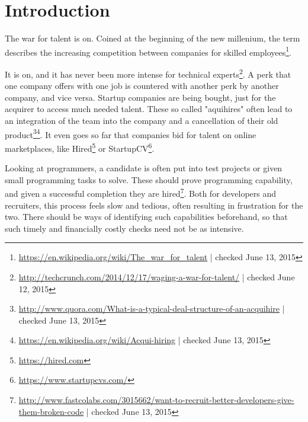 \chapter{Introduction}\label{ch:introduction}
The war for talent is on. Coined at the beginning of the new
millenium, the term describes the increasing competition between companies
for skilled employees\footnote{\url{https://en.wikipedia.org/wiki/The_war_for_talent} | checked June 13, 2015}.

It is on, and it has never been more intense for technical experts\footnote{\url{http://techcrunch.com/2014/12/17/waging-a-war-for-talent/} | checked June 12, 2015}.
A perk that one company offers with one job is countered with another perk by
another company, and vice versa. Startup companies are being bought,
just for the acquirer to access much needed talent.
These so called "aquihires" often lead to an integration of the team into
the company and a cancellation of their old product\footnote{\url{http://www.quora.com/What-is-a-typical-deal-structure-of-an-acquihire} | checked June 13, 2015}\footnote{\url{https://en.wikipedia.org/wiki/Acqui-hiring} | checked June 13, 2015}.
It even goes so far that companies bid for talent on online marketplaces, like
Hired\footnote{\url{https://hired.com}} or StartupCV\footnote{\url{https://www.startupcvs.com/}}.
\newline

Looking at programmers, a candidate is often put into
test projects or given small programming tasks to solve.
These should prove programming capability, and given a successful completion
they are hired\footnote{\url{http://www.fastcolabs.com/3015662/want-to-recruit-better-developers-give-them-broken-code} | checked June 13, 2015}.
Both for developers and recruiters, this process feels slow and tedious,
often resulting in frustration for the two. There should be ways of
identifying such capabilities beforehand, so that such timely and financially
costly checks need not be as intensive.

